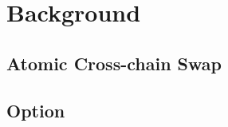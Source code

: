\section{Background}
\label{sec:background}

\subsection{Atomic Cross-chain Swap}

\subsection{Option}




